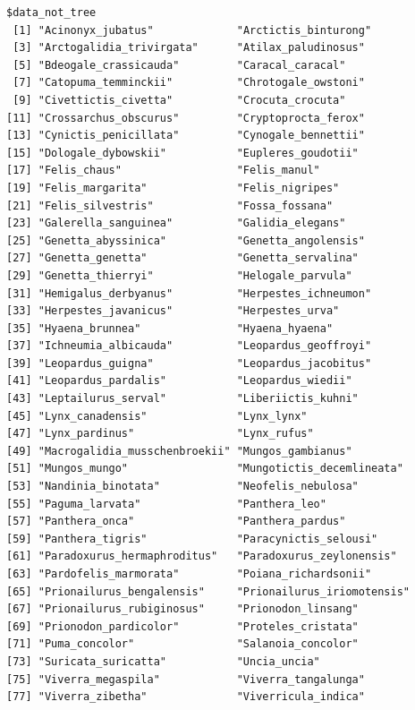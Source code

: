 \documentclass[
]{book}
\begin{document}
\begin{verbatim}
$data_not_tree
 [1] "Acinonyx_jubatus"             "Arctictis_binturong"         
 [3] "Arctogalidia_trivirgata"      "Atilax_paludinosus"          
 [5] "Bdeogale_crassicauda"         "Caracal_caracal"             
 [7] "Catopuma_temminckii"          "Chrotogale_owstoni"          
 [9] "Civettictis_civetta"          "Crocuta_crocuta"             
[11] "Crossarchus_obscurus"         "Cryptoprocta_ferox"          
[13] "Cynictis_penicillata"         "Cynogale_bennettii"          
[15] "Dologale_dybowskii"           "Eupleres_goudotii"           
[17] "Felis_chaus"                  "Felis_manul"                 
[19] "Felis_margarita"              "Felis_nigripes"              
[21] "Felis_silvestris"             "Fossa_fossana"               
[23] "Galerella_sanguinea"          "Galidia_elegans"             
[25] "Genetta_abyssinica"           "Genetta_angolensis"          
[27] "Genetta_genetta"              "Genetta_servalina"           
[29] "Genetta_thierryi"             "Helogale_parvula"            
[31] "Hemigalus_derbyanus"          "Herpestes_ichneumon"         
[33] "Herpestes_javanicus"          "Herpestes_urva"              
[35] "Hyaena_brunnea"               "Hyaena_hyaena"               
[37] "Ichneumia_albicauda"          "Leopardus_geoffroyi"         
[39] "Leopardus_guigna"             "Leopardus_jacobitus"         
[41] "Leopardus_pardalis"           "Leopardus_wiedii"            
[43] "Leptailurus_serval"           "Liberiictis_kuhni"           
[45] "Lynx_canadensis"              "Lynx_lynx"                   
[47] "Lynx_pardinus"                "Lynx_rufus"                  
[49] "Macrogalidia_musschenbroekii" "Mungos_gambianus"            
[51] "Mungos_mungo"                 "Mungotictis_decemlineata"    
[53] "Nandinia_binotata"            "Neofelis_nebulosa"           
[55] "Paguma_larvata"               "Panthera_leo"                
[57] "Panthera_onca"                "Panthera_pardus"             
[59] "Panthera_tigris"              "Paracynictis_selousi"        
[61] "Paradoxurus_hermaphroditus"   "Paradoxurus_zeylonensis"     
[63] "Pardofelis_marmorata"         "Poiana_richardsonii"         
[65] "Prionailurus_bengalensis"     "Prionailurus_iriomotensis"   
[67] "Prionailurus_rubiginosus"     "Prionodon_linsang"           
[69] "Prionodon_pardicolor"         "Proteles_cristata"           
[71] "Puma_concolor"                "Salanoia_concolor"           
[73] "Suricata_suricatta"           "Uncia_uncia"                 
[75] "Viverra_megaspila"            "Viverra_tangalunga"          
[77] "Viverra_zibetha"              "Viverricula_indica"          
\end{verbatim}
\end{document}
